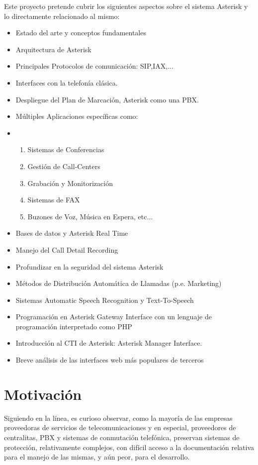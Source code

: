 Este proyecto pretende cubrir los siguientes aspectos sobre el sistema Asterisk y lo directamente relacionado al mismo:

\begin{itemize}
	\item Estado del arte y conceptos fundamentales
  \item Arquitectura de Asterisk
  \item Principales Protocolos de comunicación: SIP,IAX,...
  \item Interfaces con la telefonía clásica.
  \item Despliegue del Plan de Marcación, Asterisk como una PBX.
  \item Múltiples Aplicaciones específicas como:
  \item 
		\begin{enumerate}
	  	\item Sistemas de Conferencias
			\item Gestión de Call-Centers
	  	\item Grabación y Monitorización
	  	\item Sistemas de FAX
	  	\item Buzones de Voz, Música en Espera, etc...
	  \end{enumerate}
  \item Bases de datos y Asterisk Real Time
  \item Manejo del Call Detail Recording
  \item Profundizar en la seguridad del sistema Asterisk
  \item Métodos de Distribución Automática de Llamadas (p.e. Marketing)
  \item Sistemas Automatic Speech Recognition y Text-To-Speech
  \item Programación en Asterisk Gateway Interface con un lenguaje de programación interpretado como PHP
  \item Introducción al CTI de Asterisk: Asterisk Manager Interface.
  \item Breve análisis de las interfaces web más populares de terceros
\end{itemize}

\section{Motivación}

Siguiendo en la línea, es curioso observar, como la mayoría de las empresas proveedoras de servicios de telecomunicaciones y en especial, proveedores de centralitas, PBX y sistemas de conmutación telefónica, preservan sistemas de protección, relativamente complejos, con difícil acceso a la documentación relativa para el manejo de las mismas, y aún peor, para el desarrollo. 


